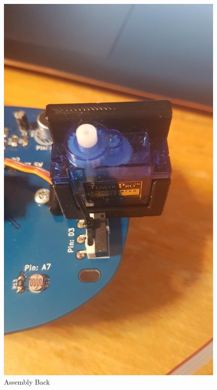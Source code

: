 \begin{figure}[h]%
\begin{minipage}{.5\textwidth}
	\includegraphics[width = 1\textwidth]{"assets/servomount_A"}
	\centering
	\caption{Assembly Back}
	\label{fig:servomount_A}
\end{minipage}
\begin{minipage}{.5\textwidth}

\end{minipage}
\end{figure}
